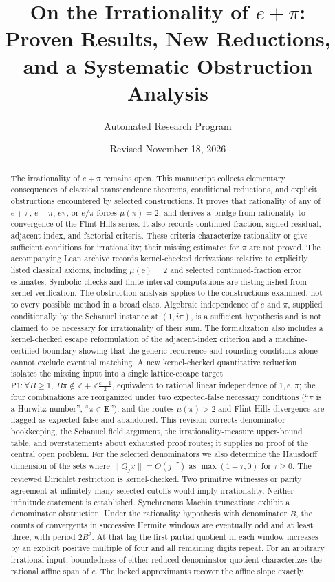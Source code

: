 \documentclass[11pt]{amsart}
\title[On the Irrationality of $e+\pi$]{On the Irrationality of $e+\pi$: Proven Results, New Reductions, and a Systematic Obstruction Analysis}
\author{Automated Research Program}
\date{Revised November 18, 2026}
\theoremstyle{definition}
\theoremstyle{remark}
\numberwithin{equation}{section}
\newcommand{\Z}{\mathbb{Z}}
\newcommand{\irr}{\mu}
\newcommand{\ee}{\mathrm{e}}
\begin{document}
\begin{abstract}
The irrationality of $e+\pi$ remains open. This manuscript collects elementary consequences of classical transcendence theorems, conditional reductions, and explicit obstructions encountered by selected constructions. It proves that rationality of any of $e+\pi$, $e-\pi$, $e\pi$, or $e/\pi$ forces $\irr(\pi)=2$, and derives a bridge from rationality to convergence of the Flint Hills series. It also records continued-fraction, signed-residual, adjacent-index, and factorial criteria. These criteria characterize rationality or give sufficient conditions for irrationality; their missing estimates for $\pi$ are not proved. The accompanying Lean archive records kernel-checked derivations relative to explicitly listed classical axioms, including $\irr(\ee)=2$ and selected continued-fraction error estimates. Symbolic checks and finite interval computations are distinguished from kernel verification. The obstruction analysis applies to the constructions examined, not to every possible method in a broad class. Algebraic independence of $e$ and $\pi$, supplied conditionally by the Schanuel instance at $(1,i\pi)$, is a sufficient hypothesis and is not claimed to be necessary for irrationality of their sum. The formalization also includes a kernel-checked escape reformulation of the adjacent-index criterion and a machine-certified boundary showing that the generic recurrence and rounding conditions alone cannot exclude eventual matching. A new kernel-checked quantitative reduction isolates the missing input into a single lattice-escape target $\mathrm{P1}:\forall B\ge1,\ B\pi\notin\Z+\Z\frac{e+1}{2}$, equivalent to rational linear independence of $1,e,\pi$; the four combinations are reorganized under two expected-false necessary conditions (``$\pi$ is a Hurwitz number'', ``$\pi\in\mathbf{E}$''), and the routes $\irr(\pi)>2$ and Flint Hills divergence are flagged as expected false and abandoned. This revision corrects denominator bookkeeping, the Schanuel field argument, the irrationality-measure upper-bound table, and overstatements about exhausted proof routes; it supplies no proof of the central open problem. For the selected denominators we also determine the Hausdorff dimension of the sets where $\|Q_jx\|=O(j^{-\tau})$ as $\max(1-\tau,0)$ for $\tau\ge0$.
The reviewed Dirichlet restriction is kernel-checked. Two primitive witnesses or parity agreement at infinitely many selected cutoffs would imply irrationality. Neither infinitude statement is established. Synchronous Machin truncations exhibit a denominator obstruction.
Under the rationality hypothesis with denominator $B$, the counts of convergents in successive Hermite windows are eventually odd and at least three, with period $2B^2$. At that lag the first partial quotient in each window increases by an explicit positive multiple of four and all remaining digits repeat.
For an arbitrary irrational input, boundedness of either reduced denominator quotient characterizes the rational affine span of $e$. The locked approximants recover the affine slope exactly.
\end{abstract}
\end{document}

